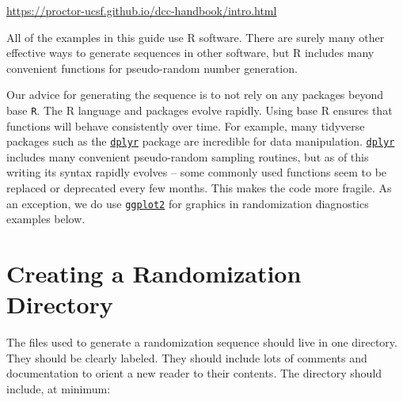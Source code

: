 \documentclass[
]{book}
\begin{document}
\url{https://proctor-ucsf.github.io/dcc-handbook/intro.html}

All of the examples in this guide use R software. There are surely many other effective ways to generate sequences in other software, but R includes many convenient functions for pseudo-random number generation.

Our advice for generating the sequence is to not rely on any packages beyond base \texttt{R}. The R language and packages evolve rapidly. Using base R ensures that functions will behave consistently over time. For example, many tidyverse packages such as the \href{https://dplyr.tidyverse.org/}{\texttt{dplyr}} package are incredible for data manipulation. \href{https://dplyr.tidyverse.org/}{\texttt{dplyr}} includes many convenient pseudo-random sampling routines, but as of this writing its syntax rapidly evolves -- some commonly used functions seem to be replaced or deprecated every few months. This makes the code more fragile. As an exception, we do use \href{https://ggplot2.tidyverse.org/}{\texttt{ggplot2}} for graphics in randomization diagnostics examples below.

\hypertarget{creating-a-randomization-directory}{%
\section{Creating a Randomization Directory}\label{creating-a-randomization-directory}}

The files used to generate a randomization sequence should live in one directory. They should be clearly labeled. They should include lots of comments and documentation to orient a new reader to their contents. The directory should include, at minimum:
\end{document}
